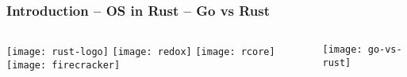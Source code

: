 \begin{frame}[plain]
	\frametitle{Introduction -- OS in Rust -- Go vs Rust}
	
	
	
	\begin{columns}
		
		\begin{column}{.2\textwidth}
			
			\texttt{[image: rust-logo]}
			\texttt{[image: redox]}
			\texttt{[image: rcore]}
			\texttt{[image: firecracker]}
		\end{column}
		
		\begin{column}{.8\textwidth}
		    \texttt{[image: go-vs-rust]}
			
			
		\end{column}
		
		
	\end{columns}
	
	
\end{frame}


